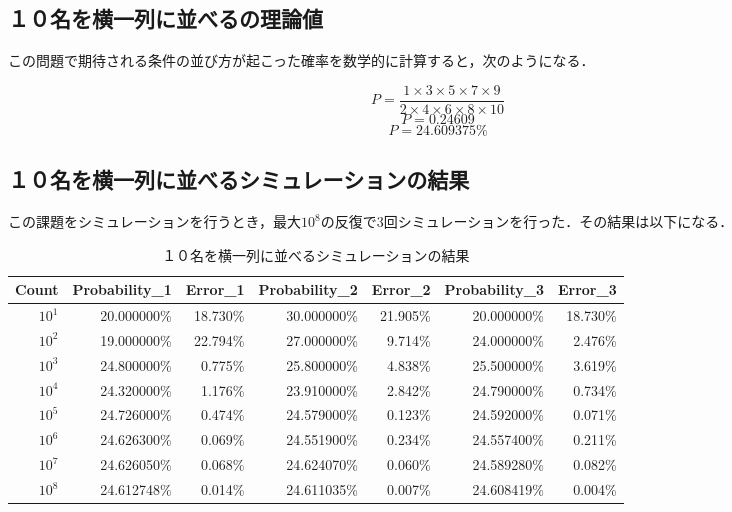 \documentclass[a4j, titlepage]{jarticle}
\begin{document}
    \subsection{１０名を横一列に並べるの理論値}
      この問題で期待される条件の並び方が起こった確率を数学的に計算すると，次のようになる．
      \begin{screen}
        \begin{equation}
          P = \frac{1 \times 3 \times 5 \times 7 \times 9}{2 \times 4 \times 6 \times 8 \times 10}
        \end{equation}
        \begin{equation}
          P = 0.24609
        \end{equation}
        \begin{equation}
          P = 24.609375\%
        \end{equation}
      \end{screen}
    
    \subsection{１０名を横一列に並べるシミュレーションの結果}
      この課題をシミュレーションを行うとき，最大$10^8$の反復で$3$回シミュレーションを行った．その結果は以下になる．

      \begin{longtable}[c]{|r|r|r|r|r|r|r|}
        \caption{１０名を横一列に並べるシミュレーションの結果}
        \label{tab:height}\\
        \hline
        \rowcolor[HTML]{C0C0C0} 
        Count    & Probability\_1 & Error\_1 & Probability\_2 & Error\_2 & Probability\_3 & Error\_3 \\ \hline
        \endfirsthead
        \endhead
        $10^1$   & 20.000000\%      & 18.730\% & 30.000000\%      & 21.905\% & 20.000000\%      & 18.730\% \\ \hline
        $10^2$   & 19.000000\%      & 22.794\% & 27.000000\%      & 9.714\%  & 24.000000\%      & 2.476\%  \\ \hline
        $10^3$   & 24.800000\%      & 0.775\%  & 25.800000\%      & 4.838\%  & 25.500000\%      & 3.619\%  \\ \hline
        $10^4$   & 24.320000\%      & 1.176\%  & 23.910000\%      & 2.842\%  & 24.790000\%      & 0.734\%  \\ \hline
        $10^5$   & 24.726000\%      & 0.474\%  & 24.579000\%      & 0.123\%  & 24.592000\%      & 0.071\%  \\ \hline
        $10^6$   & 24.626300\%      & 0.069\%  & 24.551900\%      & 0.234\%  & 24.557400\%      & 0.211\%  \\ \hline
        $10^7$   & 24.626050\%      & 0.068\%  & 24.624070\%      & 0.060\%  & 24.589280\%      & 0.082\%  \\ \hline
        $10^8$   & 24.612748\%      & 0.014\%  & 24.611035\%      & 0.007\%  & 24.608419\%      & 0.004\%  \\ \hline
      \end{longtable}
\end{document}
